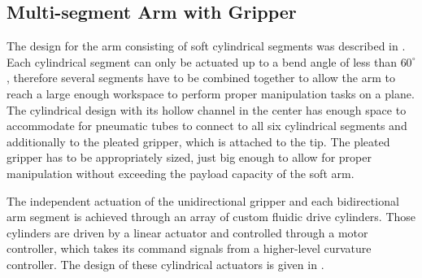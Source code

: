 \subsection{Multi-segment Arm with Gripper}

The design for the arm consisting of soft cylindrical segments was described in \cite{marchese2014whole}.
Each cylindrical segment can only be actuated up to a bend angle of less than $60^\circ$, therefore several segments have to be combined together to allow the arm to reach a large enough workspace to perform proper manipulation tasks on a plane. 
The cylindrical design with its hollow channel in the center has enough space to accommodate for pneumatic tubes to connect to all six cylindrical segments and additionally to the pleated gripper, which is attached to the tip. 
The pleated gripper has to be appropriately sized, just big enough to allow for proper manipulation without exceeding the payload capacity of the soft arm.

The independent actuation of the unidirectional gripper and each bidirectional arm segment is achieved through an array of custom fluidic drive cylinders.
Those cylinders are driven by a linear actuator and controlled through a motor controller, which takes its command signals from a higher-level curvature controller. 
The design of these cylindrical actuators is given in \cite{marchese2014design}.